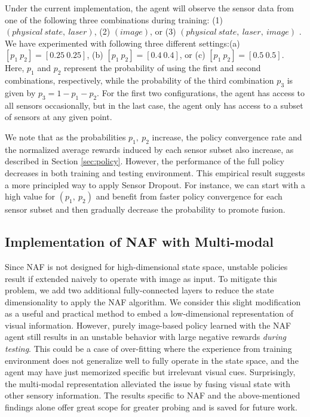 \documentclass[../thesis.tex]{subfiles}
\begin{document}

Under the current implementation, the agent will observe the sensor data from one of the following three combinations during training: (1)$(physical~state,~laser)$, (2) $(image)$, or (3) $(physical~state,~laser,~image)$ . 
We have experimented with following three different settings:(a) $[p_1~p_2] = [0.25~0.25]$, (b) $[p_1~p_2] = [0.4~0.4]$, or (c) $[p_1~p_2] = [0.5~0.5]$. Here, $p_1$ and $p_2$ represent the probability of using the first and second combinations, respectively, while the probability of the third combination $p_3$ is given by $p_3 = 1 - p_1 - p_2$. For the first two configurations, the agent has access to all sensors occasionally, but in the last case, the agent only has access to a subset of sensors at any given point. 


We note that as the probabilities $p_1,~p_2$ increase, the policy convergence rate and the normalized average rewards induced by each sensor subset also increase, as described in Section \ref{sec:policy}. However, the performance of the full policy decreases in both training and testing environment. This empirical result suggests a more principled way to apply Sensor Dropout. For instance, we can start with a high value for $(p_1,~p_2)$ and benefit from faster policy convergence for each sensor subset and then gradually decrease the probability to promote fusion. 
\subsection{Implementation of NAF with Multi-modal} \label{discussion-NAF}
Since NAF is not designed for high-dimensional state space, unstable policies result if extended naively to operate with image as input. To mitigate this problem, we add two additional fully-connected layers to reduce the state dimensionality to apply the NAF algorithm. We consider this slight modification as a useful and practical method to embed a low-dimensional representation of visual information. However, purely image-based policy learned with the NAF agent still results in an unstable behavior with large negative rewards \emph{during testing}. This could be a case of over-fitting where the experience from training environment does not generalize well to fully operate in the state space, and the agent may have just memorized specific but irrelevant visual cues. Surprisingly, the multi-modal representation alleviated the issue by fusing visual state with other sensory information. The results specific to NAF and the above-mentioned findings alone offer great scope for greater probing and is saved for future work.
\end{document}
